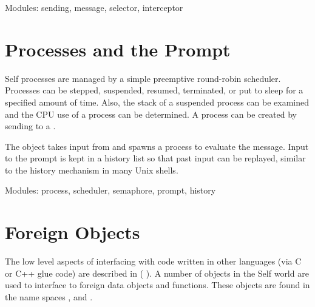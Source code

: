 \documentclass[letterpaper,10pt,english]{sphinxmanual}
\begin{document}
Modules: sending, message, selector, interceptor


\section{Processes and the Prompt}
\label{\detokenize{processes:processes-and-the-prompt}}\label{\detokenize{processes::doc}}
Self processes are managed by a simple preemptive round-robin scheduler. Processes can be
stepped, suspended, resumed, terminated, or put to sleep for a specified amount of time. Also, the
stack of a suspended process can be examined and the CPU use of a process can be determined. A
process can be created by sending  to a .

The  object takes input from  and spawns a process to evaluate the message. Input
to the prompt is kept in a history list so that past input can be replayed, similar to the history mechanism
in many Unix shells.

Modules: process, scheduler, semaphore, prompt, history


\section{Foreign Objects}
\label{\detokenize{foreign:index-4}}\label{\detokenize{foreign:foreign-objects}}\label{\detokenize{foreign::doc}}
\begin{sphinxVerbatim}[commandchars=\\\{\}]
\end{sphinxVerbatim}

The low level aspects of interfacing with code written in other languages (via C or C++ glue code)
are described in {\hyperref[\detokenize{vmref::doc}]{}} ({\hyperref[\detokenize{vmref::doc}]{}} {\hyperref[\detokenize{vmref:pp-vmref}]{}}). A number of objects in the Self
world are used to interface to foreign data objects and functions. These objects are found in the name spaces
 , and .
\end{document}
